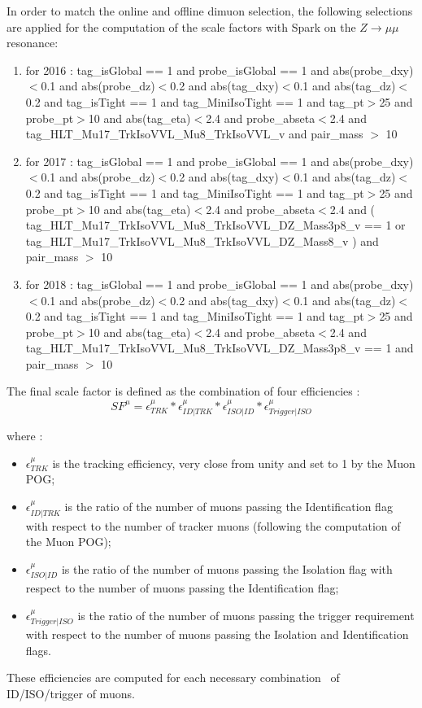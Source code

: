 \documentclass{cernatlasnote}
\begin{document}
\begin{appendices}
In order to match the online and offline dimuon selection, the following selections are applied for the computation of the scale factors with Spark on the $Z\rightarrow\mu\mu$ resonance:
\begin{enumerate}
    \item for 2016 : tag\_isGlobal == 1 and probe\_isGlobal == 1 and abs(probe\_dxy)$<$0.1 and abs(probe\_dz)$<$0.2 and abs(tag\_dxy)$<$0.1 and abs(tag\_dz)$<$0.2 and tag\_isTight == 1 and tag\_MiniIsoTight == 1 and tag\_pt$>$25 and probe\_pt$>$10  and abs(tag\_eta)$<$2.4 and probe\_abseta$<$2.4 and tag\_HLT\_Mu17\_TrkIsoVVL\_Mu8\_TrkIsoVVL\_v and pair\_mass $>$ 10
        
    \item for 2017 : tag\_isGlobal == 1 and probe\_isGlobal == 1 and abs(probe\_dxy)$<$0.1 and abs(probe\_dz)$<$0.2 and abs(tag\_dxy)$<$0.1 and abs(tag\_dz)$<$0.2 and tag\_isTight == 1 and tag\_MiniIsoTight == 1 and tag\_pt$>$25 and probe\_pt$>$10  and abs(tag\_eta)$<$2.4 and probe\_abseta$<$2.4 and ( tag\_HLT\_Mu17\_TrkIsoVVL\_Mu8\_TrkIsoVVL\_DZ\_Mass3p8\_v == 1 or \\ tag\_HLT\_Mu17\_TrkIsoVVL\_Mu8\_TrkIsoVVL\_DZ\_Mass8\_v ) and pair\_mass $>$ 10
        
    \item for 2018 :  tag\_isGlobal == 1 and probe\_isGlobal == 1 and abs(probe\_dxy)$<$0.1 and abs(probe\_dz)$<$0.2 and abs(tag\_dxy)$<$0.1 and abs(tag\_dz)$<$0.2 and tag\_isTight == 1 and tag\_MiniIsoTight == 1 and tag\_pt$>$25 and probe\_pt$>$10  and abs(tag\_eta)$<$2.4 and probe\_abseta$<$2.4 and tag\_HLT\_Mu17\_TrkIsoVVL\_Mu8\_TrkIsoVVL\_DZ\_Mass3p8\_v == 1  and pair\_mass $>$ 10
\end{enumerate}

The final scale factor is defined as the combination of four efficiencies :
\begin{equation}
    SF^{\mu} = \epsilon^{\mu}_{TRK} *\epsilon^{\mu}_{ID|TRK} * \epsilon^{\mu}_{ISO|ID} * \epsilon^{\mu}_{Trigger|ISO}
\end{equation}

where :
\begin{itemize}
    \item $\epsilon^{\mu}_{TRK}$ is the tracking efficiency, very close from unity and set to 1 by the Muon POG;
    \item $\epsilon^{\mu}_{ID|TRK}$ is the ratio of the number of muons passing the Identification flag with respect to the number of tracker muons (following the computation of the Muon POG);
    \item $\epsilon^{\mu}_{ISO|ID}$ is the ratio of the number of muons passing the Isolation flag with respect to the number of muons passing the Identification flag;
    \item $\epsilon^{\mu}_{Trigger|ISO}$ is the ratio of the number of muons passing the trigger requirement with respect to the number of muons passing the Isolation and Identification flags.
\end{itemize}
These efficiencies are computed for each necessary combination~\cite{MuonSpark3} of ID/ISO/trigger of muons.



\end{appendices}
\end{document}
